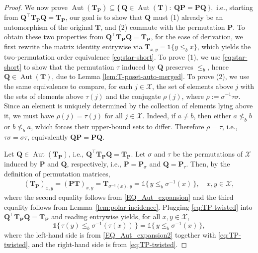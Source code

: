 \documentclass[onecolumn]{IEEEtran} %
\newcommand{\1}{\mathbbm{1}}
\DeclareMathOperator{\Aut}{Aut}
\theoremstyle{boldremark}
\begin{document}
\begin{proof}
We now prove $\Aut(\mathbf T_{\mathbf P})\subseteq
\bigl\{\,\mathbf Q\in\Aut(\mathbf T):\ \mathbf Q\mathbf P=\mathbf P\mathbf Q\,\bigr\},$ i.e., starting from \(\mathbf Q^{\top}\mathbf T_{\mathbf P}\mathbf Q=\mathbf T_{\mathbf P}\), our goal is to show that
\(\mathbf Q\) must (1) already be an automorphism of the original \(\mathbf T\), and
(2) commute with the permutation \(\mathbf P\).
To obtain these two properties from \(\mathbf Q^{\top}\mathbf T_{\mathbf P}\mathbf Q=\mathbf T_{\mathbf P}\),
for the ease of derivation, we first rewrite the matrix identity entrywise via \(\mathbf T_{x,y}=\mathds{1}\{y\le_b x\}\), which yields the two-permutation order equivalence \eqref{eq:star-short}.
To prove (1), we use \eqref{eq:star-short} to show that the permutation \(\tau\) induced by \(\mathbf Q\)
preserves \(\le_b\), hence \(\mathbf Q\in\Aut(\mathbf T)\), due to Lemma \ref{lem:T-poset-auto-merged}. To prove (2), we use the same equivalence to compare, for each \(j\in\mathcal X\), the set of elements above \(j\)
with the sets of elements above \(\tau(j)\) and the conjugate \(\rho(j)\), where \(\rho:=\sigma^{-1}\tau\sigma\).
Since an element is uniquely determined by the collection of elements lying above it, we must have
\(\rho(j)=\tau(j)\) for all \(j\in\mathcal X\). Indeed, if \(a\neq b\), then either \(a\not\le_b b\) or \(b\not\le_b a\), which forces their upper-bound sets to differ.
Therefore \(\rho=\tau\), i.e., \(\tau\sigma=\sigma\tau\), equivalently \(\mathbf Q\mathbf P=\mathbf P\mathbf Q\).


Let \(\mathbf Q\in\Aut(\mathbf T_{\mathbf P})\), i.e.,
$\mathbf Q^{\top}\mathbf T_{\mathbf P}\mathbf Q=\mathbf T_{\mathbf P}$.
Let \(\sigma\) and \(\tau\) be the permutations of \(\mathcal X\) induced by \(\mathbf P\) and \(\mathbf Q\),
respectively, i.e., \(\mathbf P=\mathbf P_\sigma\) and \(\mathbf Q=\mathbf P_\tau\).
Then, by the definition of permutation matrices,
\begin{align}
  (\mathbf T_{\mathbf P})_{x,y}
  =(\mathbf P\mathbf T)_{x,y}
  =\mathbf T_{\sigma^{-1}(x),y}
  =\mathds{1}\{\,y\le_b \sigma^{-1}(x)\,\},
  \quad x,y\in\mathcal X,  \label{eq:TP-twisted}
\end{align}
where the second equality follows from \eqref{EQ_Aut_expansion} and the third equality follows from
Lemma~\ref{lem:polar-incidence}.
Plugging \eqref{eq:TP-twisted} into $\mathbf Q^{\top}\mathbf T_{\mathbf P}\mathbf Q=\mathbf T_{\mathbf P}$ and reading entrywise yields, for all \(x,y\in\mathcal X\),
\begin{equation}\label{eq:entrywise-twisted}
  \mathds{1}\{\,\tau(y)\le_b \sigma^{-1}(\tau(x))\,\}
  =
  \mathds{1}\{\,y\le_b \sigma^{-1}(x)\,\},
\end{equation}
where the left-hand side is from \eqref{EQ_Aut_expansion2} together with \eqref{eq:TP-twisted}, and the right-hand
side is from \eqref{eq:TP-twisted}.


\end{proof}
\end{document}
